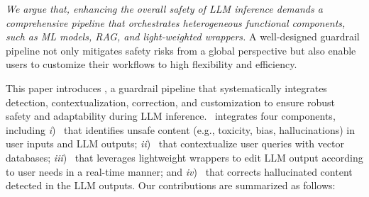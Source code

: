 

\textit{We argue that, enhancing the overall safety of LLM inference 
demands a comprehensive pipeline that orchestrates heterogeneous functional components, such as ML models, RAG, and light-weighted wrappers.} A well-designed guardrail pipeline not only mitigates safety risks from a global perspective but also enable users to customize their workflows to high flexibility and efficiency. 


This paper introduces \goodname, a guardrail pipeline that systematically integrates detection, contextualization, correction, and customization to ensure robust safety and adaptability during LLM inference. \goodname~integrates four components, including
\textit{i}) \detection~that identifies unsafe content (e.g., toxicity, bias, hallucinations) in user inputs and LLM outputs; \textit{ii}) \grounding~that contextualize user queries with vector databases; \textit{iii})
\customization~that leverages lightweight wrappers to edit LLM output according to user needs in a real-time manner; and \textit{iv})
\fixing~that corrects hallucinated content detected in the LLM outputs.
Our contributions are summarized as follows:

